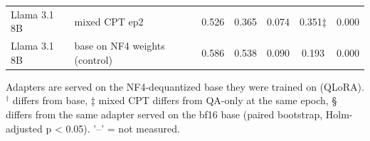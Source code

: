 \begin{table}[t]
{\begin{tabular}{llccccc}
Llama 3.1 8B & mixed CPT ep2 & 0.526 & 0.365 & 0.074 & 0.351‡ & 0.000 \\
Llama 3.1 8B & base on NF4 weights (control) & 0.586 & 0.538 & 0.090 & 0.193 & 0.000 \\
\bottomrule
\end{tabular}}
\par\smallskip\footnotesize Adapters are served on the NF4-dequantized base they were trained on (QLoRA). $^\dagger$ differs from base, ‡ mixed CPT differs from QA-only at the same epoch, § differs from the same adapter served on the bf16 base (paired bootstrap, Holm-adjusted p < 0.05). '–' = not measured.
\end{table}
